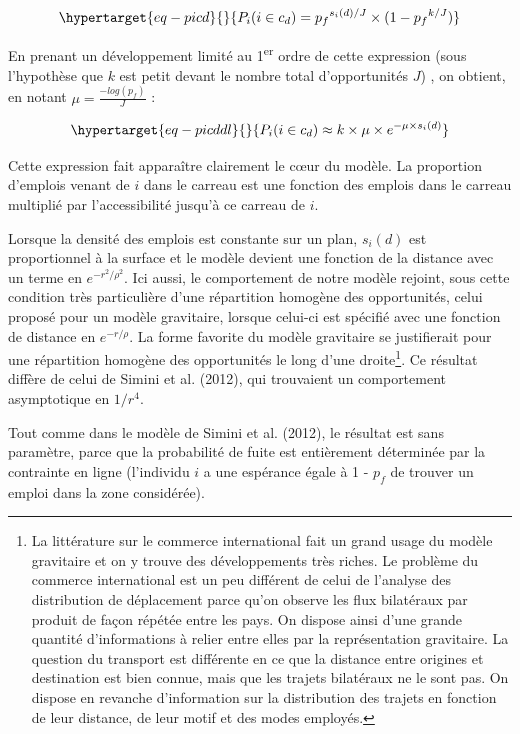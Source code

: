 \documentclass[
  10pt,
  a4paper,
  numbers=noendperiod,
  DIV=9]{scrreprt}
\begin{document}
\begin{equation}\protect\hypertarget{eq-picd}{}{
P_i(i\in c_d) = {p_f}^{s_i(d)/J}\times(1-{p_f}^{ k/J})
}\label{eq-picd}\end{equation}

En prenant un développement limité au 1\textsuperscript{er} ordre de
cette expression (sous l'hypothèse que \(k\) est petit devant le nombre
total d'opportunités \(J\)) , on obtient, en notant
\(\mu=\frac{-log(p_f)}{J}\) :

\begin{equation}\protect\hypertarget{eq-picddl}{}{
P_i(i\in c_d) \approx k\times \mu \times e^{-\mu \times s_i(d)}
}\label{eq-picddl}\end{equation}

Cette expression fait apparaître clairement le cœur du modèle. La
proportion d'emplois venant de \(i\) dans le carreau est une fonction
des emplois dans le carreau multiplié par l'accessibilité jusqu'à ce
carreau de \(i\).

Lorsque la densité des emplois est constante sur un plan, \(s_i(d)\) est
proportionnel à la surface et le modèle devient une fonction de la
distance avec un terme en \(e^{-r^2/\rho^2}\). Ici aussi, le
comportement de notre modèle rejoint, sous cette condition très
particulière d'une répartition homogène des opportunités, celui proposé
pour un modèle gravitaire, lorsque celui-ci est spécifié avec une
fonction de distance en \(e^{-r/\rho}\). La forme favorite du modèle
gravitaire se justifierait pour une répartition homogène des
opportunités le long d'une droite\footnote{La littérature sur le
  commerce international fait un grand usage du modèle gravitaire et on
  y trouve des développements très riches. Le problème du commerce
  international est un peu différent de celui de l'analyse des
  distribution de déplacement parce qu'on observe les flux bilatéraux
  par produit de façon répétée entre les pays. On dispose ainsi d'une
  grande quantité d'informations à relier entre elles par la
  représentation gravitaire. La question du transport est différente en
  ce que la distance entre origines et destination est bien connue, mais
  que les trajets bilatéraux ne le sont pas. On dispose en revanche
  d'information sur la distribution des trajets en fonction de leur
  distance, de leur motif et des modes employés.}. Ce résultat diffère
de celui de Simini et al. (2012), qui trouvaient un comportement
asymptotique en \(1/r^4\).

Tout comme dans le modèle de Simini et al. (2012), le résultat est sans
paramètre, parce que la probabilité de fuite est entièrement déterminée
par la contrainte en ligne (l'individu \(i\) a une espérance égale à 1 -
\(p_f\) de trouver un emploi dans la zone considérée).
\end{document}

